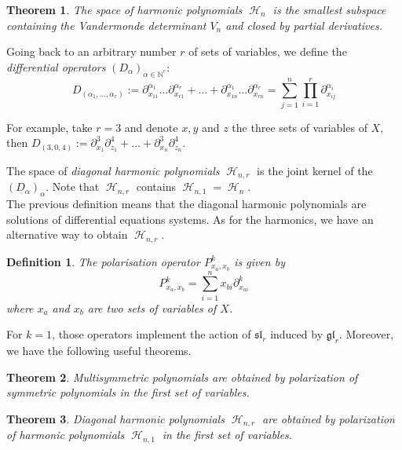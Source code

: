 \documentclass[letter,12pt]{article}
\newcommand{\NN}{\mathbb{N}}
\DeclareMathOperator{\harmonics}{\mathcal{H}}
\newtheorem{theorem}{Theorem}
\newtheorem{definition}{Definition}
\begin{document}
	\begin{theorem}
		The space of harmonic polynomials $\harmonics_{n}$ is the smallest subspace containing the Vandermonde determinant $V_n$ and closed by partial derivatives.
	\end{theorem}
	
	Going back to an arbitrary number $r$ of sets of variables, we define the \emph{differential operators} $(D_\alpha)_{\alpha\in \NN^r}$:
	$$D_{(\alpha_1, \dots, \alpha_r)} := \partial_{x_{11}}^{\alpha_1}\dots\partial_{x_{r1}}^{\alpha_r} + \dots + \partial_{x_{1n}}^{\alpha_1}\dots\partial_{x_{rn}}^{\alpha_r} = \sum_{j=1}^{n} \prod_{i=1}^{r} \partial_{x_{ij}}^{\alpha_i}$$
	
	For example, take $r=3$ and denote $x, y$ and $z$ the three sets of variables of $X$, then $D_{(3,0,4)} := \partial_{x_1}^3\partial_{z_1}^4 + \dots + \partial_{x_n}^3\partial_{z_n}^4$. 
	
	The space of \emph{diagonal harmonic polynomials} $\harmonics_{n,r}$ is the joint kernel of the $(D_\alpha)_\alpha$. Note that $\harmonics_{n,r}$ contains $\harmonics_{n,1} = \harmonics_{n}$.\\
	
	The previous definition means that the diagonal harmonic polynomials are solutions of differential equations systems. 
	As for the harmonics, we have an alternative way to obtain $\harmonics_{n,r}$. 
	
	\begin{definition}
		The \emph{polarisation operator} $P_{x_a,x_b}^k$ is given by
		$$P_{x_a,x_b}^k = \sum_{i=1}^{n} x_{bi} \partial_{x_{ai}}^k$$
		where $x_a$ and $x_b$ are two sets of variables of $X$. 
	\end{definition}
	
	For $k=1$, those operators implement the action of $\mathfrak{sl}_r$ induced by $\mathfrak{gl}_r$. Moreover, we have the following useful theorems. 
	
	\begin{theorem}
		Multisymmetric polynomials are obtained by polarization of symmetric polynomials in the first set of variables.
	\end{theorem}
	
	\begin{theorem} \label{DiagHarm}
		Diagonal harmonic polynomials $\harmonics_{n,r}$ are obtained by polarization of harmonic polynomials $\harmonics_{n,1}$ in the first set of variables.
	\end{theorem}
	
\end{document}
